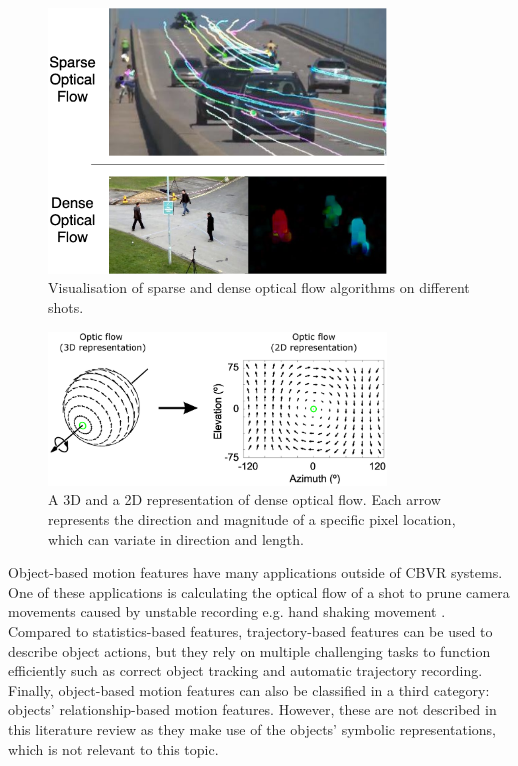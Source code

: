 \begin{itemize}
    \begin{figure}[h] 
    \centerline{\includegraphics[width=0.80\textwidth]{figures/litsurvey/optical_flow.png}}
    \caption{\label{fig:optical_flow}Visualisation of sparse and dense optical flow algorithms on different shots.}
    \end{figure}
        
    \begin{figure}[h] 
    \centerline{\includegraphics[width=0.80\textwidth]{figures/litsurvey/dense_optical_flow_representation.png}}
    \caption{\label{fig:dense_optical_flow_representation}A 3D and a 2D representation of dense optical flow. Each arrow represents the direction and magnitude of a specific pixel location, which can variate in direction and length.}
    \end{figure}
    
    Object-based motion features have many applications outside of CBVR systems. One of these applications is calculating the optical flow of a shot to prune camera movements caused by unstable recording e.g. hand shaking movement \cite{wang2016actionregonition}. Compared to statistics-based features, trajectory-based features can be used to describe object actions, but they rely on multiple challenging tasks to function efficiently such as correct object tracking and automatic trajectory recording. Finally, object-based motion features can also be classified in a third category: objects' relationship-based motion features. However, these are not described in this literature review as they make use of the objects' symbolic representations, which is not relevant to this topic.
\end{itemize}

